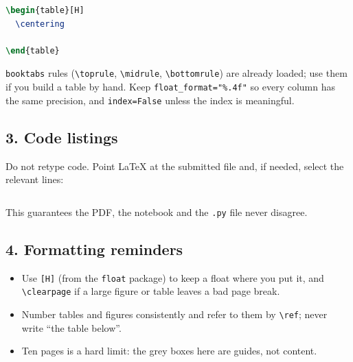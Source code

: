 \documentclass[12pt,a4paper]{article}
\begin{document}
\begin{lstlisting}[language=TeX]
\begin{table}[H]
  \centering
  
\end{table}
\end{lstlisting}

\texttt{booktabs} rules (\texttt{\textbackslash toprule},
\texttt{\textbackslash midrule}, \texttt{\textbackslash bottomrule}) are
already loaded; use them if you build a table by hand. Keep
\texttt{float\_format="\%.4f"} so every column has the same precision, and
\texttt{index=False} unless the index is meaningful.

\subsection*{3. Code listings}

Do not retype code. Point LaTeX at the submitted file and, if needed, select
the relevant lines:

\begin{lstlisting}[language=TeX]

\end{lstlisting}

This guarantees the PDF, the notebook and the \texttt{.py} file never
disagree.

\subsection*{4. Formatting reminders}
\begin{itemize}[leftmargin=*,itemsep=2pt]
  \item Use \texttt{[H]} (from the \texttt{float} package) to keep a float
        where you put it, and \texttt{\textbackslash clearpage} if a large
        figure or table leaves a bad page break.
  \item Number tables and figures consistently and refer to them by
        \texttt{\textbackslash ref}; never write ``the table below''.
  \item Ten pages is a hard limit: the grey boxes here are guides, not
        content.
\end{itemize}
\end{document}
